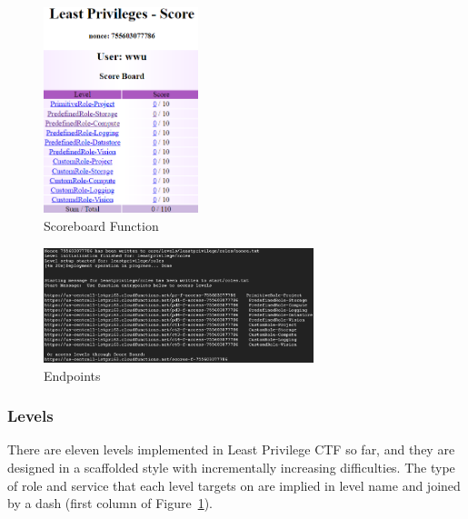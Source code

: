 \begin{figure}[!h]
  \centering
  \includegraphics[width=0.4\textwidth]{pic/score}
  \caption {Scoreboard Function}
  \label{fig:score}
\end{figure}

\begin{figure}[h]
  \centering
  \includegraphics[width=0.7\textwidth]{pic/endpoints}
  \caption {Endpoints}
   \label{fig:endpoints}
\end{figure}
\subsubsection{Levels}
There are eleven levels implemented in Least Privilege CTF so far, and they are designed in a scaffolded style with incrementally increasing difficulties. The type of role and service that each level targets on are implied in level name and joined by a dash (first column of Figure~\ref{fig:score}). 

